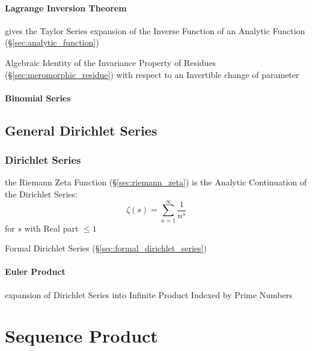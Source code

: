 \paragraph{Lagrange Inversion Theorem}\label{sec:lagrange_inversion}\hfill

gives the Taylor Series expansion of the Inverse Function of an Analytic
Function (\S\ref{sec:analytic_function})

Algebraic Identity of the Invariance Property of Residues
(\S\ref{sec:meromorphic_residue}) with respect to an Invertible change of
parameter



\paragraph{Binomial Series}\label{sec:binomial_series}\hfill


\subsection{General Dirichlet Series}\label{sec:general_dirichlet}




\subsubsection{Dirichlet Series}\label{sec:dirichlet_series}

the Riemann Zeta Function (\S\ref{sec:riemann_zeta}) is the Analytic
Continuation of the Dirichlet Series:
\[
  \zeta(s) = \sum_{n=1}^\infty \frac{1}{n^s}
\]
for $s$ with Real part $\leq 1$

\fist Formal Dirichlet Series (\S\ref{sec:formal_dirichlet_series})



\paragraph{Euler Product}\label{sec:euler_product}\hfill

expansion of Dirichlet Series into Infinite Product Indexed by Prime Numbers



\section{Sequence Product}\label{sec:sequence_product}


